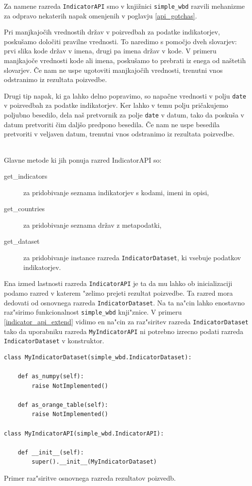 Za namene razreda \verb|IndicatorAPI| smo v knjižnici \verb|simple_wbd|
razvili mehanizme za odpravo nekaterih napak omenjenih v poglavju 
\ref{api_gotchas}.

Pri manjkajočih vrednostih držav v poizvedbah za podatke indikatorjev,
poskušamo določiti pravilne vrednosti. To naredimo s pomočjo dveh
slovarjev: prvi slika kode držav v imena, drugi pa imena držav v kode. V
primeru manjkajoče vrednosti kode ali imena, poskušamo to prebrati iz enega
od naštetih slovarjev. Če nam ne uspe ugotoviti manjkajočih vrednosti,
trenutni vnos odstranimo iz rezultata poizvedbe.

Drugi tip napak, ki ga lahko delno popravimo, so napačne vrednosti v polju
\verb|date| v poizvedbah za podatke indikatorjev. Ker lahko v temu polju
pričakujemo poljubno besedilo, dela naš pretvornik za polje \verb|date| v 
datum, tako da poskuša v datum pretvoriti čim daljšo predpono besedila.
Če nam ne uspe besedila pretvoriti v veljaven datum, trenutni vnos odstranimo
iz rezultata poizvedbe.


\ \\
Glavne metode ki jih ponuja razred IndicatorAPI so:

\begin{description}  
\item [get\_indicators] za pridobivanje seznama indikatorjev s kodami, imeni
      in opisi,
\item [get\_countries] za pridobivanje seznama držav z metapodatki,
\item [get\_dataset] za pridobivanje instance razreda \verb|IndicatorDataset|,
      ki vsebuje podatkov indikatorjev.
\end{description}

Ena izmed lastnosti razreda \verb|IndicatorAPI| je ta da mu lahko ob
inicializaciji podamo razred v katerem "zelimo prejeti rezultat poizvedbe. Ta
razred mora dedovati od osnovnega razreda \verb|IndicatorDataset|. Na ta
na"cin lahko enostavno raz"sirimo funkcionalnost \verb|simple_wbd| knji"znice.
V primeru \ref{indicator_api_extend} vidimo en na"cin za raz"siritev razreda 
\verb|IndicatorDataset| tako da uporabniku razreda \verb|MyIndicatorAPI| ni
potrebno izrecno podati razreda \verb|IndicatorDataset| v konstruktor.

\begin{snippet}
\begin{center}
\begin{lstlisting}
class MyIndicatorDataset(simple_wbd.IndicatorDataset):
    
    def as_numpy(self):
        raise NotImplemented()
    
    def as_orange_table(self):
        raise NotImplemented()

class MyIndicatorAPI(simple_wbd.IndicatorAPI):

    def __init__(self):
        super().__init__(MyIndicatorDataset)
\end{lstlisting}
\end{center}
\caption[some]{Primer raz"siritve osnovnega razreda rezultatov poizvedb.}
\label{indicator_api_extend}
\end{snippet} 


